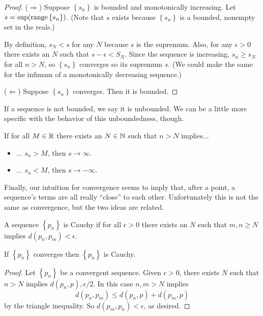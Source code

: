 \documentclass[../m131main.tex]{subfiles}
\begin{document}
\begin{proof}
    ($\Rightarrow$) Suppose $\left\{ s_n \right\}$ is bounded and monotonically increasing.
    Let $s = \sup (\textrm{range} \left\{ s_n \right\})$.
    (Note that $s$ exists because $\left\{ s_n \right\}$ is a bounded, nonempty set in the reals.)

    By definition, $s_N < s$ for any $N$ because $s$ is the supremum.
    Also, for any $\epsilon > 0$ there exists an $N$ such that $s - \epsilon < S_N$.
    Since the sequence is increasing, $s_n \geq s_N$ for all $n > N$, so $\left\{ s_n \right\}$ converges so its supremum $s$.
    (We could make the same for the infimum of a monotonically decreasing sequence.)

    ($\Leftarrow$) Suppose $\left\{ s_n \right\}$ converges.
    Then it is bounded.
\end{proof}

If a sequence is not bounded, we say it is unbounded.
We can be a little more specific with the behavior of this unboundedness, though.

\begin{definition}
    If for all $M \in \mathbb{R}$ there exists an $N \in \mathbb{N}$ such that $n > N$ implies...
    \begin{itemize}
        \item ... $s_n > M$, then $s \to \infty$.
        \item ... $s_n < M$, then $s \to -\infty$.
    \end{itemize}
\end{definition}

Finally, our intuition for convergence seems to imply that, after a point, a sequence's terms are all really ``close'' to each other.
Unfortunately this is not the same as convergence, but the two ideas are related.

\begin{definition}
    A sequence $\left\{ p_n \right\}$ is Cauchy if for all $\epsilon > 0$ there exists an $N$ such that $m,n \geq N$ implies $d(p_n, p_m) < \epsilon$.
\end{definition}

\begin{theorem}[]
    If $\left\{ p_n \right\}$ converges then $\left\{ p_n \right\}$ is Cauchy.
\end{theorem}

\begin{proof}
    Let $\left\{ p_n \right\}$ be a convergent sequence.
    Given $\epsilon > 0$, there exists $N$ such that $n > N$ implies $d(p_n, p) , \epsilon / 2$.
    In this case $n,m > N$ implies
    \[ d(p_n, p_m) \leq d(p_n, p) + d(p_m, p) \]
    by the triangle inequality.
    So $d(p_m, p_n) < \epsilon$, as desired.
\end{proof}
\end{document}
